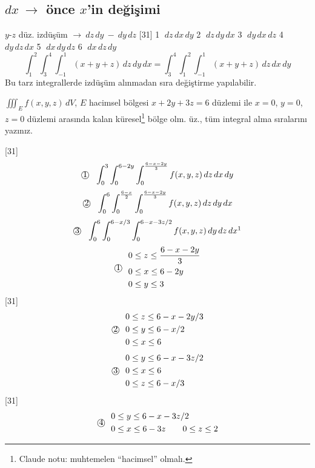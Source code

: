 \documentclass[11pt,a4paper]{article}
\begin{document}
\subsection*{$dx\ \longrightarrow$ önce $x$'in değişimi}
$y$-$z$ düz. izdüşüm $\longrightarrow\ dz\,dy\ -\ dy\,dz$
[31]
\noindent\textcircled{1} $dz\,dx\,dy$ \quad \textcircled{2} $dz\,dy\,dx$ \quad \textcircled{3} $dy\,dx\,dz$ \quad \textcircled{4} $dy\,dz\,dx$ \quad \textcircled{5} $dx\,dy\,dz$ \quad \textcircled{6} $dx\,dz\,dy$
\[ \int_1^2\int_3^4\int_{-1}^{1}(x+y+z)\,dz\,dy\,dx=\int_3^4\int_1^2\int_{-1}^{1}(x+y+z)\,dz\,dx\,dy \]
\noindent Bu tarz integrallerde izdüşüm alınmadan sıra değiştirme yapılabilir.
\begin{ornek}
$\displaystyle\iiint_E f(x,y,z)\,dV$, $E$ hacimsel bölgesi $x+2y+3z=6$ düzlemi ile $x=0$, $y=0$, $z=0$ düzlemi arasında kalan küresel\footnote{Claude notu: muhtemelen ``hacimsel'' olmalı.} bölge olm. üz., tüm integral alma sıralarını yazınız.
\end{ornek}
[31]
\[ \text{\textcircled{1}}\ \ \int_0^3\int_0^{6-2y}\int_0^{\frac{6-x-2y}{3}}f(x,y,z)\,dz\,dx\,dy \]
\[ \text{\textcircled{2}}\ \ \int_0^6\int_0^{\frac{6-x}{2}}\int_0^{\frac{6-x-2y}{3}}f(x,y,z)\,dz\,dy\,dx \]
\[ \text{\textcircled{3}}\ \ \int_0^6\int_0^{6-x/3}\int_0^{6-x-3z/2}f(x,y,z)\,dy\,dz\,dx\footnotemark \]
\[ \text{\textcircled{1}}\ \ \begin{aligned}0&\le z\le\frac{6-x-2y}{3}\\0&\le x\le6-2y\\0&\le y\le3\end{aligned} \]
[31]
\[ \text{\textcircled{2}}\ \ \begin{aligned}0&\le z\le6-x-2y/3\\0&\le y\le6-x/2\\0&\le x\le6\end{aligned} \]
\[ \text{\textcircled{3}}\ \ \begin{aligned}0&\le y\le6-x-3z/2\\0&\le x\le6\\0&\le z\le6-x/3\end{aligned} \]
[31]
\[ \text{\textcircled{4}}\ \ \begin{aligned}0&\le y\le6-x-3z/2\\0&\le x\le6-3z\qquad 0\le z\le2\end{aligned} \]
\end{document}
